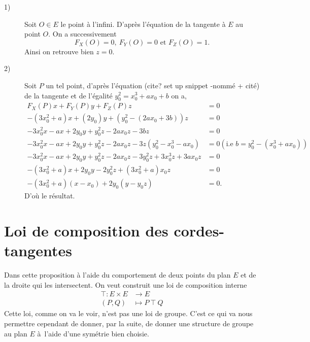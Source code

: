\begin{demonstration}
    \begin{description}
        \item[1)] Soit  $O \in E$ le point à l'infini. D'après l'équation de la tangente à $E$ au point $O$. On a successivement 
            \[
            F_{X}(O) = 0, \ F_{Y}(O) = 0 \text{ et } F_{Z}(O) = 1
            .\] 
            Ainsi on retrouve bien $z = 0$.

        \item[2)] Soit $P$ un tel point, d'après l'équation (cite? set up snippet -nommé + cité) de la tangente et de l'égalité $y_0^2 = x_0^3 + ax_0 + b$ on a,
            \begin{align*}
                F_{X}(P)x + F_{Y}(P)y + F_{Z}(P)z &= 0 \\
                - \left( 3x_0^2 + a \right)x + \left( 2y_0 \right)y + \left( y_0^2 - \left( 2ax_0 + 3b \right) \right)z &= 0 \\
                - 3x_0^2x - ax + 2y_0y + y_0^2z - 2ax_0z - 3bz &= 0 \\ 
                - 3x_0^2x - ax + 2y_0y + y_0^2z - 2ax_0z - 3z\left( y_0^2 - x_0^3 - ax_0 \right) &= 0 \left( \text{i.e } b = y_0^2 - \left( x_0^3 + ax_0 \right) \right) \\
                - 3x_0^2x -ax + 2y_0y + y_0^2z - 2ax_0z - 3y_0^2z + 3x_0^3z + 3ax_0z &= 0 \\
                - \left( 3x_0^2 + a \right)x + 2y_0y - 2y_0^2z + \left( 3x_0^2 + a \right)x_0z &= 0\\
                - \left( 3x_0^2 + a \right)\left( x - x_0 \right) + 2y_0\left( y - y_0z \right) &= 0
            .\end{align*}
            D'où le résultat.
    \end{description}
    
\end{demonstration}


\section{Loi de composition des cordes-tangentes}

Dans cette proposition à l'aide du comportement de deux points du plan $E$ et de la droite qui les intersectent. On veut construit une loi de composition interne
\[
\begin{align*}
    \top : E \times E &\longrightarrow E \\
    (P,Q) &\longmapsto P  \ \top  \ Q
\end{align*}
\] 
Cette loi, comme on va le voir, n'est pas une loi de groupe. C'est ce qui va nous permettre cependant de donner, par la suite, de donner une structure de groupe au plan $E$ à l'aide d'une symétrie bien choisie.


